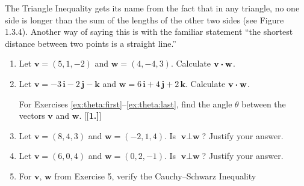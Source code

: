 \piccaption[]{}
\par The Triangle Inequality gets its name from the fact that in any triangle, no one side is longer than the sum of
the lengths of the other two sides (see Figure 1.3.4). Another way of saying this is with the familiar statement ``the
shortest distance between two points is a straight line.''


\startexercises\label{sec1dot3}
\begin{enumerate}[\bfseries 1.]
 \item Let $\textbf{v} = (5,1,-2)$ and $\textbf{w} = (4,-4,3)$. Calculate $\textbf{v} \bm{\cdot} \textbf{w}$.
 \item Let $\textbf{v} = -3\,\textbf{i} - 2\,\textbf{j} - \textbf{k}$ and
  $\textbf{w} = 6\,\textbf{i} + 4\,\textbf{j} + 2\,\textbf{k}$. Calculate $\textbf{v} \bm{\cdot} \textbf{w}$.
\par\noindent For Exercises \ref{ex:theta:first}--\ref{ex:theta:last}, find the angle $\theta$ between the vectors $\textbf{v}$ and $\textbf{w}$.
[{[\bfseries 1.]}]
 \item Let $\textbf{v} = (8,4,3)$ and $\textbf{w} = (-2,1,4)$. Is $\textbf{v} \perp \textbf{w}$? Justify your answer.
 \item Let $\textbf{v} = (6,0,4)$ and $\textbf{w} = (0,2,-1)$. Is $\textbf{v} \perp \textbf{w}$? Justify your answer.
 \item For $\textbf{v}$, $\textbf{w}$ from Exercise 5, verify the Cauchy--Schwarz Inequality

\end{enumerate}
